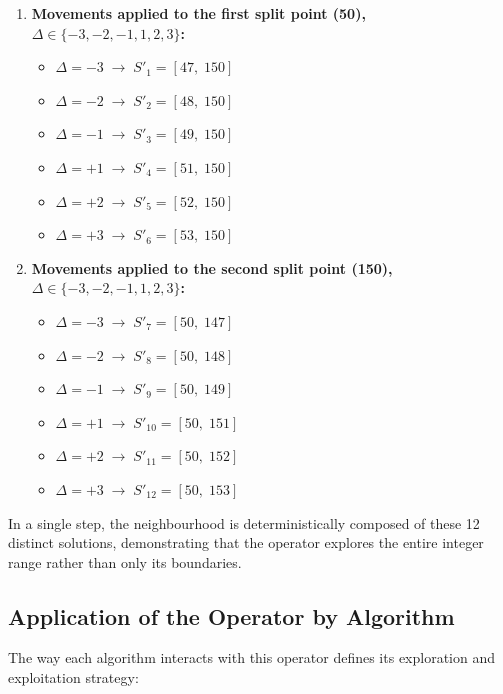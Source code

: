\documentclass[12pt, a4paper]{article}
\begin{document}
\begin{enumerate}[itemsep=0.2em]
  \item \textbf{Movements applied to the first split point (50),
          $\Delta \in \{-3, -2, -1, 1, 2, 3\}$:}
        \begin{itemize}[itemsep=0.15em]
          \item $\Delta = -3 \;\rightarrow\; S'_1  = [47,\; 150]$
          \item $\Delta = -2 \;\rightarrow\; S'_2  = [48,\; 150]$
          \item $\Delta = -1 \;\rightarrow\; S'_3  = [49,\; 150]$
          \item $\Delta = +1 \;\rightarrow\; S'_4  = [51,\; 150]$
          \item $\Delta = +2 \;\rightarrow\; S'_5  = [52,\; 150]$
          \item $\Delta = +3 \;\rightarrow\; S'_6  = [53,\; 150]$
        \end{itemize}
  \item \textbf{Movements applied to the second split point (150),
          $\Delta \in \{-3, -2, -1, 1, 2, 3\}$:}
        \begin{itemize}[itemsep=0.15em]
          \item $\Delta = -3 \;\rightarrow\; S'_7  = [50,\; 147]$
          \item $\Delta = -2 \;\rightarrow\; S'_8  = [50,\; 148]$
          \item $\Delta = -1 \;\rightarrow\; S'_9  = [50,\; 149]$
          \item $\Delta = +1 \;\rightarrow\; S'_{10} = [50,\; 151]$
          \item $\Delta = +2 \;\rightarrow\; S'_{11} = [50,\; 152]$
          \item $\Delta = +3 \;\rightarrow\; S'_{12} = [50,\; 153]$
        \end{itemize}
\end{enumerate}

In a single step, the neighbourhood is deterministically composed of these 12 distinct
solutions, demonstrating that the operator explores the entire integer range rather than
only its boundaries.

\subsection{Application of the Operator by Algorithm}
The way each algorithm interacts with this operator defines its exploration and
exploitation strategy:
\end{document}
